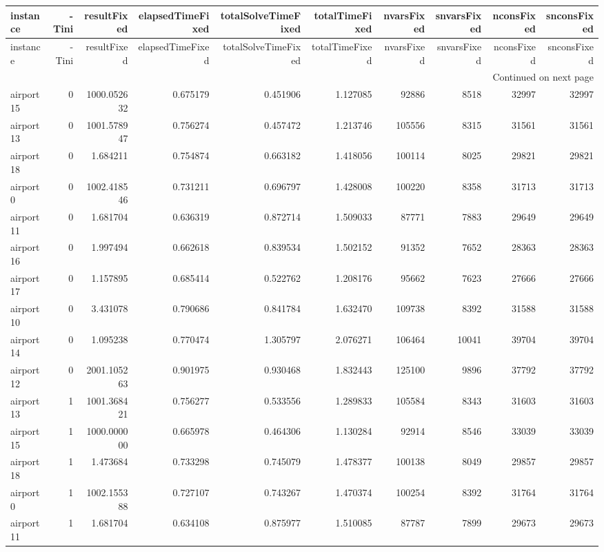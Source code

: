 
\begin{longtable}{|l|r|r|r|r|r|r|r|r|r|}
\toprule
instance & -Tini & resultFixed & elapsedTimeFixed & totalSolveTimeFixed & totalTimeFixed & nvarsFixed & snvarsFixed & nconsFixed & snconsFixed \\
\midrule
\endfirsthead
\toprule
instance & -Tini & resultFixed & elapsedTimeFixed & totalSolveTimeFixed & totalTimeFixed & nvarsFixed & snvarsFixed & nconsFixed & snconsFixed \\
\midrule
\endhead
\midrule
\multicolumn{10}{r}{Continued on next page} \\
\midrule
\endfoot
\bottomrule
\endlastfoot
airport15 & 0 & 1000.052632 & 0.675179 & 0.451906 & 1.127085 & 92886 & 8518 & 32997 & 32997 \\
airport13 & 0 & 1001.578947 & 0.756274 & 0.457472 & 1.213746 & 105556 & 8315 & 31561 & 31561 \\
airport18 & 0 & 1.684211 & 0.754874 & 0.663182 & 1.418056 & 100114 & 8025 & 29821 & 29821 \\
airport0 & 0 & 1002.418546 & 0.731211 & 0.696797 & 1.428008 & 100220 & 8358 & 31713 & 31713 \\
airport11 & 0 & 1.681704 & 0.636319 & 0.872714 & 1.509033 & 87771 & 7883 & 29649 & 29649 \\
airport16 & 0 & 1.997494 & 0.662618 & 0.839534 & 1.502152 & 91352 & 7652 & 28363 & 28363 \\
airport17 & 0 & 1.157895 & 0.685414 & 0.522762 & 1.208176 & 95662 & 7623 & 27666 & 27666 \\
airport10 & 0 & 3.431078 & 0.790686 & 0.841784 & 1.632470 & 109738 & 8392 & 31588 & 31588 \\
airport14 & 0 & 1.095238 & 0.770474 & 1.305797 & 2.076271 & 106464 & 10041 & 39704 & 39704 \\
airport12 & 0 & 2001.105263 & 0.901975 & 0.930468 & 1.832443 & 125100 & 9896 & 37792 & 37792 \\
airport13 & 1 & 1001.368421 & 0.756277 & 0.533556 & 1.289833 & 105584 & 8343 & 31603 & 31603 \\
airport15 & 1 & 1000.000000 & 0.665978 & 0.464306 & 1.130284 & 92914 & 8546 & 33039 & 33039 \\
airport18 & 1 & 1.473684 & 0.733298 & 0.745079 & 1.478377 & 100138 & 8049 & 29857 & 29857 \\
airport0 & 1 & 1002.155388 & 0.727107 & 0.743267 & 1.470374 & 100254 & 8392 & 31764 & 31764 \\
airport11 & 1 & 1.681704 & 0.634108 & 0.875977 & 1.510085 & 87787 & 7899 & 29673 & 29673 \\

\end{longtable}
